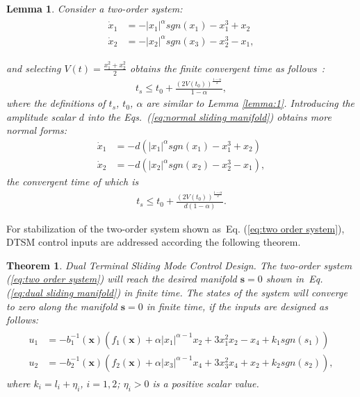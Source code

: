 \documentclass[3p]{elsarticle}
\theoremstyle{plain}
\newtheorem{mylem}{Lemma}
\newtheorem{mythm}{Theorem}
\theoremstyle{remark}
\begin{document}
\begin{mylem}
Consider a two-order system:
\begin{align}
\begin{split}
\dot x_1&=-\vert x_1\vert^\alpha sgn(x_1)-x_1^3+x_2\\
\dot x_2&=-\vert x_2\vert^\alpha sgn(x_3)-x_2^3-x_1,\label{eq:normal sliding manifold}
\end{split}
\end{align}\par
and selecting $V(t) = \frac{x_1^2+x_2^2}{2}$ obtains the finite convergent time as follows~\cite{moulay2006finite}:
\begin{align}
t_s\le t_0+\frac{(2V(t_0))^{\frac{1-\alpha}{2}}}{1-\alpha},
\end{align}
where the definitions of  $t_s$, $t_0$, $\alpha$ are similar to Lemma \ref{lemma:1}. Introducing the amplitude scalar $d$ into the Eqs.~(\ref{eq:normal sliding manifold}) obtains  more normal forms:
\begin{align}
\dot x_1&=-d(\vert x_1\vert^\alpha sgn(x_1)-x_1^3+x_2)\\
\dot x_2&=-d(\vert x_2\vert^\alpha sgn(x_2)-x_2^3-x_1),\label{eq:more normal sliding manifold}
\end{align}
the convergent time of which is
\begin{align}
t_s\le t_0+\frac{(2V(t_0))^{\frac{1-\alpha}{2}}}{d(1-\alpha)}.
\end{align}\label{lemma:2}
\end{mylem}
For stabilization of the two-order system shown as~Eq. (\ref{eq:two order system}), DTSM control inputs are addressed according the following theorem.
\begin{mythm}\label{theorem:1}Dual Terminal Sliding Mode Control Design.
The two-order system (\ref{eq:two order system}) will reach the desired manifold $\bm s = 0$ shown in~Eq. (\ref{eq:dual sliding manifold}) in finite time. The states of the system will converge to zero along the manifold $\bm s=0$ in finite time, if the inputs are designed as follows:
\begin{align}
\begin{split}
u_1 &= -b_1^{-1}(\bm x)(f_1(\bm x)+\alpha\vert x_1\vert^{\alpha-1}x_2+3x_1^2x_2-x_4+k_1sgn(s_1))\\
u_2 &= -b_2^{-1}(\bm x)(f_2(\bm x)+\alpha\vert x_3\vert^{\alpha-1}x_4+3x_3^2x_4+x_2+k_2sgn(s_2)),\label{eq:DSM input}
\end{split}
\end{align}
where $k_i = l_i+\eta_i$, $i=1,2$; $\eta_i>0$ is a positive scalar value.
\end{mythm}
\end{document}
